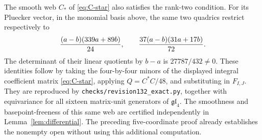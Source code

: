 \begin{remark}
The smooth web \(C_*\) of \eqref{eq:C-star} also satisfies the
rank-two condition.  For its Pluecker vector, in the monomial basis
above, the same two quadrics restrict respectively to
\[
 { (a-b)(339a+89b)\over24},\qquad
 {37(a-b)(31a+17b)\over72}.
\]
The determinant of their linear quotients by \(b-a\) is
\(27787/432\ne0\).  These identities follow by taking the
four-by-four minors of the displayed integral coefficient matrix
\eqref{eq:C-star}, applying \(Q=C^*C/48\), and substituting in
\(F_{I,J}\).  They are reproduced by
\texttt{checks/revision132\_exact.py}, together with equivariance
for all sixteen matrix-unit generators of \(\mathfrak{gl}_4\).
The smoothness and basepoint-freeness of this same web are certified
independently in Lemma~\ref{lem:differential}.  The preceding
five-coordinate proof already establishes the nonempty open without
using this additional computation.
\end{remark}

